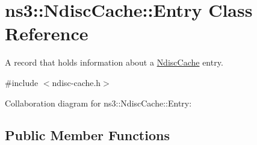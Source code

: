 \hypertarget{classns3_1_1NdiscCache_1_1Entry}{}\section{ns3\+:\+:Ndisc\+Cache\+:\+:Entry Class Reference}
\label{classns3_1_1NdiscCache_1_1Entry}


A record that holds information about a \hyperlink{classns3_1_1NdiscCache}{Ndisc\+Cache} entry.  




{\ttfamily \#include $<$ndisc-\/cache.\+h$>$}



Collaboration diagram for ns3\+:\+:Ndisc\+Cache\+:\+:Entry\+:
\subsection*{Public Member Functions}

